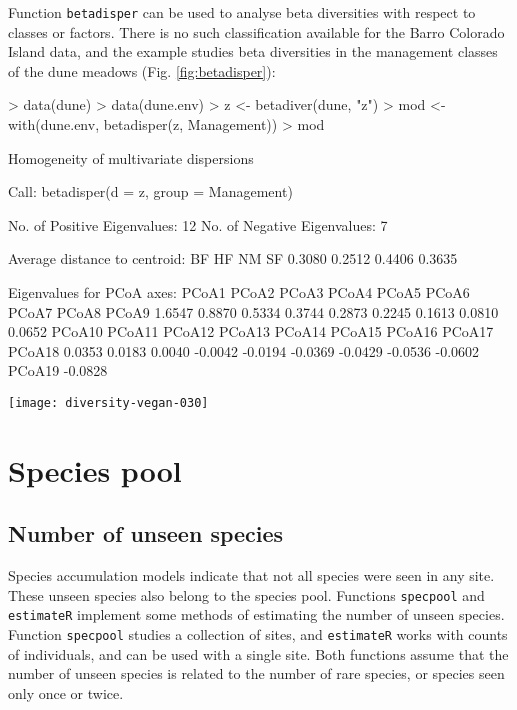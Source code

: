 \documentclass[a4paper,10pt]{amsart}
\begin{document}
Function \texttt{betadisper} can be used to analyse beta diversities
with respect to classes or factors.  There is no such classification
available for the Barro Colorado Island data, and the example studies
beta diversities in the management classes of the dune meadows
(Fig. \ref{fig:betadisper}):
\begin{Schunk}
\begin{Sinput}
> data(dune)
> data(dune.env)
> z <- betadiver(dune, "z")
> mod <- with(dune.env, betadisper(z, Management))
> mod
\end{Sinput}
\begin{Soutput}
	Homogeneity of multivariate dispersions

Call: betadisper(d = z, group = Management)

No. of Positive Eigenvalues: 12
No. of Negative Eigenvalues: 7

Average distance to centroid:
    BF     HF     NM     SF 
0.3080 0.2512 0.4406 0.3635 

Eigenvalues for PCoA axes:
  PCoA1   PCoA2   PCoA3   PCoA4   PCoA5   PCoA6   PCoA7   PCoA8   PCoA9 
 1.6547  0.8870  0.5334  0.3744  0.2873  0.2245  0.1613  0.0810  0.0652 
 PCoA10  PCoA11  PCoA12  PCoA13  PCoA14  PCoA15  PCoA16  PCoA17  PCoA18 
 0.0353  0.0183  0.0040 -0.0042 -0.0194 -0.0369 -0.0429 -0.0536 -0.0602 
 PCoA19 
-0.0828 
\end{Soutput}
\end{Schunk}
\begin{SCfigure}
\texttt{[image: diversity-vegan-030]}
\caption{Box plots of beta diversity measured as the average steepness
  ($z$) of the species area curve in the Arrhenius model $S = cX^z$ in
  Management classes of dune meadows.}
\label{fig:betadisper}
\end{SCfigure}

\section{Species pool}
\subsection{Number of unseen species}

Species accumulation models indicate that not all species were seen in
any site.  These unseen species also belong to the species pool.
Functions \texttt{specpool} and \texttt{estimateR} implement some
methods of estimating the number of unseen species.  Function
\texttt{specpool} studies a collection of sites, and
\texttt{estimateR} works with counts of individuals, and can be used
with a single site.  Both functions assume that the number of unseen
species is related to the number of rare species, or species seen only
once or twice.
\end{document}
